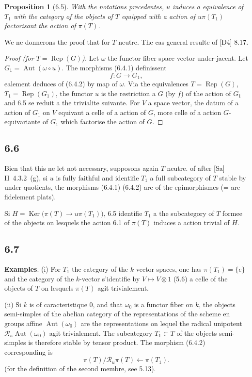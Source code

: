 \documentclass[12pt,a4paper]{article}
\theoremstyle{plain}
\newtheorem{proposition}[theorem]{Proposition}
\theoremstyle{definition}
\theoremstyle{remark}
\DeclareMathOperator{\Aut}{Aut}
\DeclareMathOperator{\Ker}{Ker}
\DeclareMathOperator{\Rep}{Rep}
\begin{document}
\begin{proposition}[6.5]\label{prop:6.5}
With the notations precedentes, $u$ induces a equivalence of $T_1$ with the category of the objects of $T$ equipped with a action of $u\pi(T_1)$ factorisant the action of $\pi(T)$.
\end{proposition}

We ne donnerons the proof that for $T$ neutre. The cas general resulte of [D4] 8.17.

\begin{proof}[Proof (for $T = 
\Rep(G)$)]
Let $\omega$ the functor fiber space vector under-jacent. Let $G_1 = 
\Aut(\omega 
\circ u)$. The morphisms (6.4.1) definissent
\begin{equation*}\tag{6.5.1}
f: G 
\longrightarrow G_1,
\end{equation*}
ealement deduces of (6.4.2) by map of $\omega$. Via the equivalences $T = 
\Rep(G)$, $T_1 = 
\Rep(G_1)$, the functor $u$ is the restriction a $G$ (by $f$) of the action of $G_1$ and 6.5 se reduit a the trivialite suivante. For $V$ a space vector, the datum of a action of $G_1$ on $V$ equivaut a celle of a action of $G$, more celle of a action $G$-equivariante of $G_1$ which factorise the action of $G$.
\end{proof}

\subsection*{6.6}
Bien that this ne let not necessary, supposons again $T$ neutre. of after [Sa] II~4.3.2~(g), si $u$ is fully faithful and identifie $T_1$ a full subcategory of $T$ stable by under-quotients, the morphisms (6.4.1) (6.4.2) are of the epimorphismes (= are fidelement plats).

Si $H = 
\Ker\bigl(\pi(T) 
\to u\pi(T_1)\bigr)$, 6.5 identifie $T_1$ a the subcategory of $T$ formee of the objects on lesquels the action 6.1 of $\pi(T)$ induces a action trivial of $H$.

\subsection*{6.7}
\textbf{Examples}. (i) For $T_1$ the category of the $k$-vector spaces, one has $\pi(T_1) = 
\{e\}$ and the category of the $k$-vector s'identifie by $V 
\mapsto V 
\otimes 1$ (5.6) a celle of the objects of $T$ on lesquels $\pi(T)$ agit trivialement.

(ii) Si $k$ is of caracteristique 0, and that $\omega_0$ is a functor fiber on $k$, the objects semi-simples of the abelian category of the representations of the scheme en groups affine $\Aut(\omega_0)$ are the representations on lequel the radical unipotent $\mathcal{R}_u\Aut(\omega_0)$ agit trivialement. The subcategory $T_1 
\subset T$ of the objects semi-simples is therefore stable by tensor product. The morphism (6.4.2) corresponding is
\[
\pi(T)/\mathcal{R}_u\pi(T) 
\longleftarrow 
\pi(T_1).
\]
(for the definition of the second membre, see 5.13).
\end{document}
